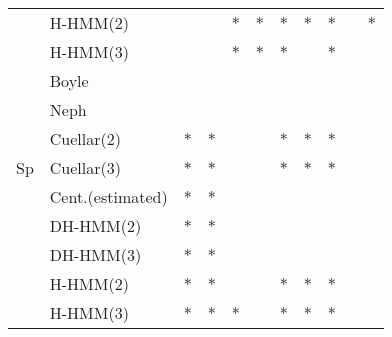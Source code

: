 \documentclass[landscape, 8pt]{report}
\begin{document}
\begin{table}[h!]
\begin{center}
\begin{tabular}{ llccccccccc }
    & H-HMM(2) &     &     & $*$ & $*$ & $*$ & $*$ & $*$ &     & $*$ \\
    & H-HMM(3) &     &     & $*$ & $*$ & $*$ &     & $*$ &     &     \\
  \hline
    \multirow{7}{*}{\begin{sideways}Sp\end{sideways}}
    & Boyle &     &     &     &     &     &     &     &     &     \\
    & Neph &     &     &     &     &     &     &     &     &     \\
    & Cuellar(2) & $*$ & $*$ &     &     & $*$ & $*$ & $*$ &     &     \\
    & Cuellar(3) & $*$ & $*$ &     &     & $*$ & $*$ & $*$ &     &     \\
    & Cent.(estimated) & $*$ & $*$ &     &     &     &     &     &     &     \\
    & DH-HMM(2) & $*$ & $*$ &     &     &     &     &     &     &     \\
    & DH-HMM(3) & $*$ & $*$ &     &     &     &     &     &     &     \\
    & H-HMM(2) & $*$ & $*$ &     &     & $*$ & $*$ & $*$ &     &     \\
    & H-HMM(3) & $*$ & $*$ & $*$ &     & $*$ & $*$ & $*$ &     &     \\
  \hline
  \end{tabular}
\end{center}
\vspace{0.0cm}
\end{table}
\end{document}
